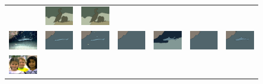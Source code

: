 \begin{figure}
\begin{center}
\begin{tabular}{ c  c  c  c  c  c  c }
&\includegraphics[width=2cm]{fig/visual_result/visual_result_3_6.png}
&\includegraphics[width=2cm]{fig/visual_result/visual_result_3_7.png}
\\
\includegraphics[width=2cm]{fig/visual_result/visual_result_4_1.png}
&\includegraphics[width=2cm]{fig/visual_result/visual_result_4_2.png}
&\includegraphics[width=2cm]{fig/visual_result/visual_result_4_3.png}
&\includegraphics[width=2cm]{fig/visual_result/visual_result_4_4.png}
&\includegraphics[width=2cm]{fig/visual_result/visual_result_4_5.png}
&\includegraphics[width=2cm]{fig/visual_result/visual_result_4_6.png}
&\includegraphics[width=2cm]{fig/visual_result/visual_result_4_7.png}
\\
\includegraphics[width=2cm]{fig/visual_result/visual_result_5_1.png}

\end{tabular}
\end{center}
\end{figure}
